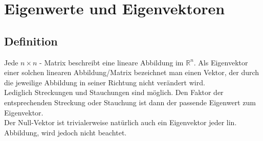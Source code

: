 
\section{Eigenwerte und Eigenvektoren}
\label{sec:eigenwerte_und_eigenvektoren}

\subsection{Definition}
\label{sub:definition}
Jede $n \times n$ - Matrix beschreibt eine lineare Abbildung im $\mathbb{R}^n$.
Als Eigenvektor einer solchen linearen Abbildung/Matrix bezeichnet man einen Vektor, der durch die jeweilige 
Abbildung in seiner Richtung nicht verändert wird.\\
Lediglich Streckungen und Stauchungen sind möglich. Den Faktor der entsprechenden 
Streckung oder Stauchung ist dann der passende Eigenwert zum Eigenvektor.\\
Der Null-Vektor ist trivialerweise natürlich auch ein Eigenvektor jeder lin. Abbildung, wird jedoch nicht beachtet.
